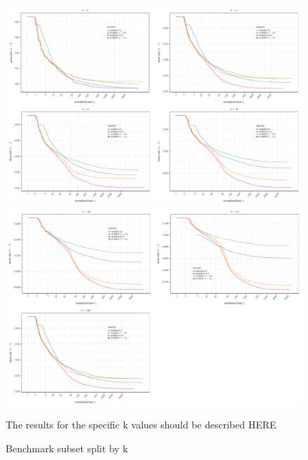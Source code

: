 \documentclass[a4paper,12pt,titlepage, BCOR7mm,headsepline]{scrbook}
\numberwithin{equation}{section}
\begin{document}
\begin{figure}[H]
\caption{Benchmark subset split by k}
\begin{center}
\includegraphics[width=\textwidth]{rnw/appendix_convergence-1}
\includegraphics[width=\textwidth]{rnw/appendix_convergence-2}
\end{center}
The results for the specific k values should be described HERE
\end{figure}
\end{document}
